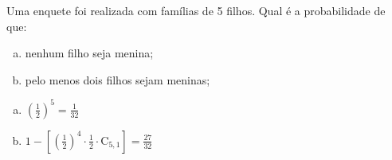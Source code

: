 \begin{ex}
Uma enquete foi realizada com famílias de 5 filhos. Qual é a probabilidade de que:
   \begin{enumerate}[(a)]
   \item nenhum filho seja menina;
   \item pelo menos dois filhos sejam meninas;
   \end{enumerate}
    \begin{sol}
     \phantom{A}
      \begin{enumerate} [(a)]
          \item $(\frac{1}{2})^5=\frac{1}{32}$
          \item $1-[(\frac{1}{2})^4\cdot\frac{1}{2}\cdot\mathrm{C}_{5,1}]=\frac{27}{32}$
      \end{enumerate}
    \end{sol}
\end{ex}